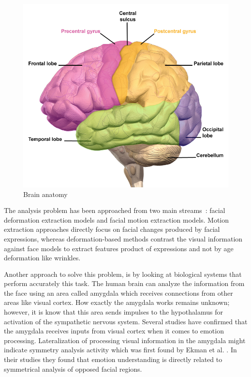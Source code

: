 \begin{figure}[ht]
    \centering
    \includegraphics[scale=1.0]{images/Figure6Brain.png}
    \caption{Brain anatomy}
    \label{fig:Brain anatomy}
\end{figure}

The analysis problem has been approached from two main streams~\cite{Fasel1999}: facial deformation extraction models and facial motion extraction models. Motion extraction approaches directly focus on facial changes produced by facial expressions, whereas deformation-based methods contrast the visual information against face models to extract features product of expressions and not by age deformation like wrinkles.

Another approach to solve this problem, is by looking at biological systems that perform accurately this task. The human brain can analyze the information from the face using an area called amygdala which receives connections from other areas like visual cortex. How exactly the amygdala works remains unknown; however, it is know that this area sends impulses to the hypothalamus for activation of the sympathetic nervous system. Several studies have confirmed that the amygdala receives inputs from visual cortex when it comes to emotion processing. Lateralization of processing visual information in the amygdala might indicate symmetry analysis activity which was first found by Ekman et al. \cite{Hager1979}. In their studies they found that emotion understanding is directly related to symmetrical analysis of opposed facial regions.

